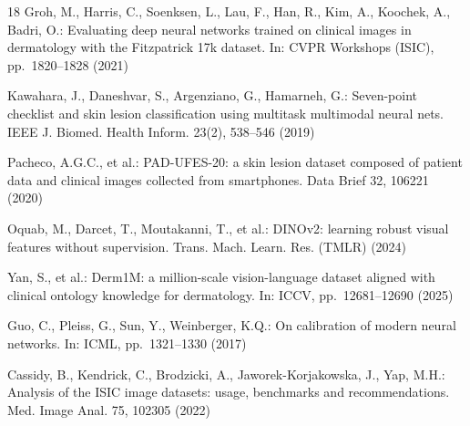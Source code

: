 \documentclass{svproc}
\begin{document}
\begin{thebibliography}{18}
Groh, M., Harris, C., Soenksen, L., Lau, F., Han, R., Kim, A., Koochek, A., Badri, O.:
Evaluating deep neural networks trained on clinical images in dermatology with the
Fitzpatrick 17k dataset. In: CVPR Workshops (ISIC), pp.~1820--1828 (2021)

Kawahara, J., Daneshvar, S., Argenziano, G., Hamarneh, G.: Seven-point checklist and
skin lesion classification using multitask multimodal neural nets. IEEE J. Biomed.
Health Inform. 23(2), 538--546 (2019)

Pacheco, A.G.C., et al.: PAD-UFES-20: a skin lesion dataset composed of patient data
and clinical images collected from smartphones. Data Brief 32, 106221 (2020)

Oquab, M., Darcet, T., Moutakanni, T., et al.: DINOv2: learning robust visual features
without supervision. Trans. Mach. Learn. Res. (TMLR) (2024)

Yan, S., et al.: Derm1M: a million-scale vision-language dataset aligned with clinical
ontology knowledge for dermatology. In: ICCV, pp.~12681--12690 (2025)

Guo, C., Pleiss, G., Sun, Y., Weinberger, K.Q.: On calibration of modern neural
networks. In: ICML, pp.~1321--1330 (2017)

Cassidy, B., Kendrick, C., Brodzicki, A., Jaworek-Korjakowska, J., Yap, M.H.: Analysis
of the ISIC image datasets: usage, benchmarks and recommendations. Med. Image Anal. 75,
102305 (2022)

\end{thebibliography}
\end{document}

